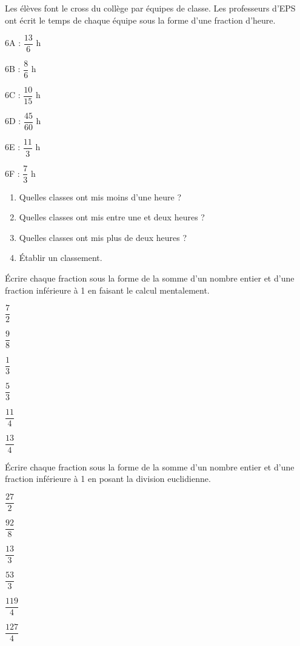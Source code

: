 \begin{colonne*exercice}
\begin{exercice}
   Les élèves font le cross du collège par équipes de classe. Les professeurs d'EPS ont écrit le temps de chaque équipe sous la forme d'une fraction d'heure. \ \medskip
   \begin{colitemize}{3}
      \item 6A : $\dfrac{13}{6}$ h \bigskip
      \item 6B : $\dfrac86$ h \bigskip
      \item 6C : $\dfrac{10}{15}$ h \bigskip
      \item 6D : $\dfrac{45}{60}$ h \bigskip
      \item 6E : $\dfrac{11}3$ h
      \item 6F : $\dfrac73$ h
   \end{colitemize}
   \vspace*{-5mm}
   \begin{enumerate}
      \item Quelles classes ont mis moins d'une heure ?
      \item Quelles classes ont mis entre une et deux heures ?
      \item Quelles classes ont mis plus de deux heures ?
      \item Établir un classement.
   \end{enumerate}
\end{exercice}

\medskip


\begin{exercice}
   Écrire chaque fraction sous la forme de la somme d'un nombre entier et d'une fraction inférieure à 1 en faisant le calcul mentalement. \medskip
   \begin{colenumerate}{3}
      \item $\dfrac72$ \bigskip
      \item $\dfrac98$
      \item $\dfrac13$
      \item $\dfrac53$
      \item $\dfrac{11}{4}$
      \item $\dfrac{13}{4}$
   \end{colenumerate}
\end{exercice}

\medskip

\begin{exercice}
   Écrire chaque fraction sous la forme de la somme d'un nombre entier et d'une fraction inférieure à 1 en posant la division euclidienne. \medskip
   \begin{colenumerate}{3}
      \item $\dfrac{27}2$ \bigskip
      \item $\dfrac{92}8$ \bigskip
      \item $\dfrac{13}{3}$
      \item $\dfrac{53}{3}$
      \item $\dfrac{119}{4}$
      \item $\dfrac{127}{4}$
   \end{colenumerate}
\end{exercice}


\end{colonne*exercice}
